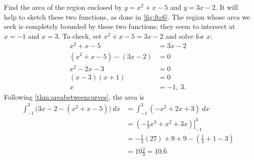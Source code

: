 \begin{example}\label{ex_ftc6}
Find the area of the region enclosed by $y=x^2+x-5$ and $y=3x-2$.
\solution
It will help to sketch these two functions, as done in \autoref{fig:ftc6}. 
The region whose area we seek is completely bounded by these two functions; they seem to intersect at $x=-1$ and $x=3$. To check, set $x^2+x-5=3x-2$ and solve for $x$:\vspace{-.5\baselineskip}
\begin{align*}
	x^2+x-5 &= 3x-2 \\
	(x^2+x-5) - (3x-2) &= 0\\
	x^2-2x-3 &= 0\\
	(x-3)(x+1) &= 0\\
	x&=-1,\ 3.
\end{align*}
Following \autoref{thm:areabetweencurves}, the area is 
\begin{align*}
	\int_{-1}^3\bigl(3x-2 -(x^2+x-5)\bigr)\ dx &= \int_{-1}^3 (-x^2+2x+3)\ dx \\
	&=\left.\left(-\frac13x^3+x^2+3x\right)\right|_{-1}^3 \\
	&=-\frac13(27)+9+9-\left(\frac13+1-3\right)\\
	&= 10\frac23 = 10.\overline{6}
\end{align*}
\end{example}

